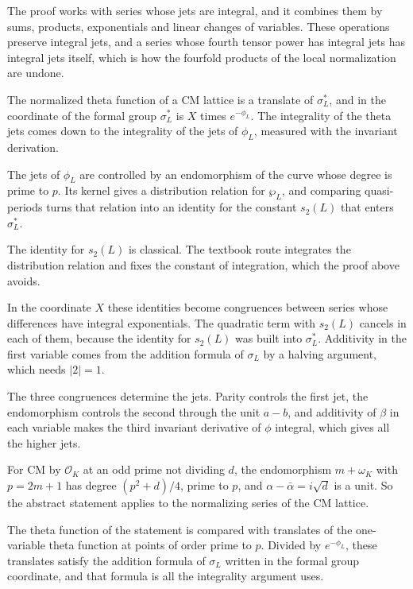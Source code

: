 The proof works with series whose jets are integral, and it combines them by sums, products,
exponentials and linear changes of variables. These operations preserve integral jets, and a series
whose fourth tensor power has integral jets has integral jets itself, which is how the fourfold
products of the local normalization are undone.

The normalized theta function of a CM lattice is a translate of $\sigma^*_L$, and in the coordinate
of the formal group $\sigma^*_L$ is $X$ times $e^{-\phi_L}$. The integrality of the theta jets
comes down to the integrality of the jets of $\phi_L$, measured with the invariant derivation.

The jets of $\phi_L$ are controlled by an endomorphism of the curve whose degree is prime to $p$.
Its kernel gives a distribution relation for $\wp_L$, and comparing quasi-periods turns that relation
into an identity for the constant $s_2(L)$ that enters $\sigma^*_L$.

The identity for $s_2(L)$ is classical. The textbook route integrates the distribution relation and
fixes the constant of integration, which the proof above avoids.

In the coordinate $X$ these identities become congruences between series whose differences have
integral exponentials. The quadratic term with $s_2(L)$ cancels in each of them, because the identity
for $s_2(L)$ was built into $\sigma^*_L$. Additivity in the first variable comes from the addition
formula of $\sigma_L$ by a halving argument, which needs $|2|=1$.

The three congruences determine the jets. Parity controls the first jet, the endomorphism
controls the second through the unit $a-b$, and additivity of $\beta$ in each variable makes the
third invariant derivative of $\phi$ integral, which gives all the higher jets.

For CM by $\mathcal O_K$ at an odd prime not dividing $d$, the endomorphism $m+\omega_K$ with
$p=2m+1$ has degree $(p^2+d)/4$, prime to $p$, and $\alpha-\bar\alpha=i\sqrt d$ is a unit. So the
abstract statement applies to the normalizing series of the CM lattice.

The theta function of the statement is compared with translates of the one-variable theta
function at points of order prime to $p$. Divided by $e^{-\phi_L}$, these translates satisfy the
addition formula of $\sigma_L$ written in the formal group coordinate, and that formula is all the
integrality argument uses.

